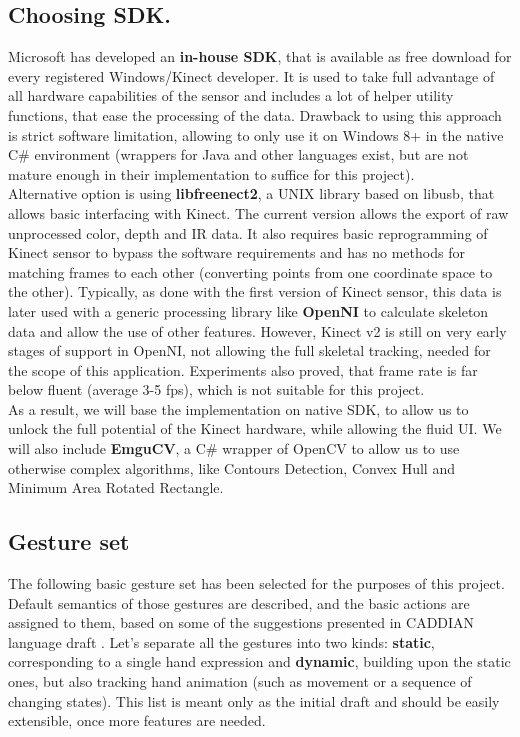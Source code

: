 \documentclass[a4paper,11pt,oneside]{article}
\begin{document}
\subsection{Choosing SDK.}

Microsoft has developed an \textbf{in-house SDK}, that is available as free download for every registered Windows/Kinect developer. It is used to take full advantage of all hardware capabilities of the sensor and includes a lot of helper utility functions, that ease the processing of the data. Drawback to using this approach is strict software limitation, allowing to only use it on Windows 8+ in the native C\# environment (wrappers for Java and other languages exist, but are not mature enough in their implementation to suffice for this project).\\

Alternative option is using \textbf{libfreenect2}, a UNIX library based on libusb, that allows basic interfacing with Kinect. The current version allows the export of raw unprocessed color, depth and IR data. It also requires basic reprogramming of Kinect sensor to bypass the software requirements and has no methods for matching frames to each other (converting points from one coordinate space to the other). Typically, as done with the first version of Kinect sensor, this data is later used with a generic processing library like \textbf{OpenNI} to calculate skeleton data and allow the use of other features. However, Kinect v2 is still on very early stages of support in OpenNI, not allowing the full skeletal tracking, needed for the scope of this application. Experiments also proved, that frame rate is far below fluent (average 3-5 fps), which is not suitable for this project.\\

As a result, we will base the implementation on native SDK, to allow us to unlock the full potential of the Kinect hardware, while allowing the fluid UI. We will also include \textbf{EmguCV}, a C\# wrapper of OpenCV to allow us to use otherwise complex algorithms, like Contours Detection, Convex Hull and Minimum Area Rotated Rectangle.
 
  \subsection{Gesture set}
	
    The following basic gesture set has been selected for the purposes of this project. Default semantics of those gestures are described, and the basic actions are assigned to them, based on some of the suggestions presented in CADDIAN language draft \cite{AB01}. Let's separate all the gestures into two kinds: \textbf{static}, corresponding to a single hand expression and \textbf{dynamic},  building upon the static ones, but also tracking hand animation (such as movement or a sequence of changing states). This list is meant only as the initial draft and should be easily extensible, once more features are needed.
    
\end{document}

